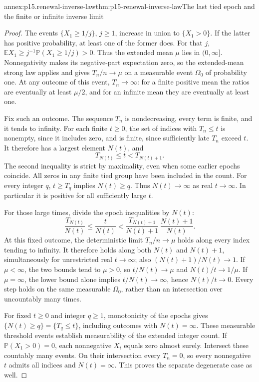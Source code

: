 \begin{annexitem}{annex:p15.renewal-inverse-law}{thm:p15-renewal-inverse-law}{The last tied epoch and the finite or infinite inverse limit}
\begin{proof}
The events \(\{X_1\geq1/j\}\), \(j\geq1\), increase in union
to \(\{X_1>0\}\). If the latter has positive probability, at least
one of the former does. For that \(j\),
\(\mathbb EX_1\geq j^{-1}\mathbb P(X_1\geq1/j)>0\).
Thus the extended mean \(\mu\) lies in \((0,\infty]\).
Nonnegativity makes its negative-part expectation zero, so the
extended-mean strong law applies and gives \(T_n/n\to\mu\)
on a measurable event \(\Omega_0\) of probability one.
At any outcome of this event, \(T_n\to\infty\): for a finite
positive mean the ratios are eventually at least \(\mu/2\),
and for an infinite mean they are eventually at least one.

Fix such an outcome. The sequence \(T_n\) is nondecreasing, every
term is finite, and it tends to infinity. For each finite \(t\geq0\),
the set of indices with \(T_n\leq t\) is nonempty, since it includes
zero, and is finite, since sufficiently late \(T_n\) exceed \(t\).
It therefore has a largest element \(N(t)\), and
\[
 T_{N(t)}\leq t<T_{N(t)+1}.
\]
The second inequality is strict by maximality, even when some earlier
epochs coincide. All zeros in any finite tied group have been included
in the count. For every integer \(q\), \(t\geq T_q\) implies
\(N(t)\geq q\). Thus \(N(t)\to\infty\) as real \(t\to\infty\).
In particular it is positive for all sufficiently large \(t\).

For those large times, divide the epoch inequalities by \(N(t)\):
\[
 \frac{T_{N(t)}}{N(t)}
   \leq\frac{t}{N(t)}
   <\frac{T_{N(t)+1}}{N(t)+1}\,
                       \frac{N(t)+1}{N(t)}.
\]
At this fixed outcome, the deterministic limit \(T_n/n\to\mu\)
holds along every index tending to infinity. It therefore holds along
both \(N(t)\) and \(N(t)+1\), simultaneously for unrestricted
real \(t\to\infty\); also \((N(t)+1)/N(t)\to1\).
If \(\mu<\infty\), the two bounds tend to \(\mu>0\),
so \(t/N(t)\to\mu\) and \(N(t)/t\to1/\mu\).
If \(\mu=\infty\), the lower bound alone implies
\(t/N(t)\to\infty\), hence \(N(t)/t\to0\).
Every step holds on the same measurable \(\Omega_0\), rather than
an intersection over uncountably many times.

For fixed \(t\geq0\) and integer \(q\geq1\), monotonicity of the
epochs gives
\(\{N(t)\geq q\}=\{T_q\leq t\}\), including outcomes with
\(N(t)=\infty\). These measurable threshold events establish
measurability of the extended integer count.
If \(\mathbb P(X_1>0)=0\), each nonnegative \(X_i\) equals zero
almost surely. Intersect these countably many events. On their
intersection every \(T_n=0\), so every nonnegative \(t\) admits
all indices and \(N(t)=\infty\). This proves the separate degenerate
case as well.
\end{proof}
\end{annexitem}

